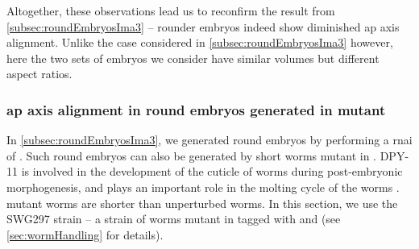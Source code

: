Altogether, these observations lead us to reconfirm the result from \autoref{subsec:roundEmbryosIma3} -- rounder embryos indeed show diminished \ac{ap} axis alignment. Unlike the case considered in \autoref{subsec:roundEmbryosIma3} however, here the two sets of embryos we consider have similar volumes but different aspect ratios.

\subsubsection{\acs{ap} axis alignment in round embryos generated in  mutant}\label{subsubsec:dpy11Mutant}
In \autoref{subsec:roundEmbryosIma3}, we generated round embryos by performing a \ac{rnai} of . Such round embryos can also be generated by short worms mutant in  \citep{ko2002novel,yamamoto2017asymmetric}. DPY-11 is involved in the development of the cuticle of worms during post-embryonic morphogenesis, and plays an important role in the molting cycle of the worms \citep{ko2002novel}.  mutant worms are shorter than unperturbed worms. In this section, we use the SWG297 strain -- a strain of worms mutant in  tagged with  and  (see \autoref{sec:wormHandling} for details).

